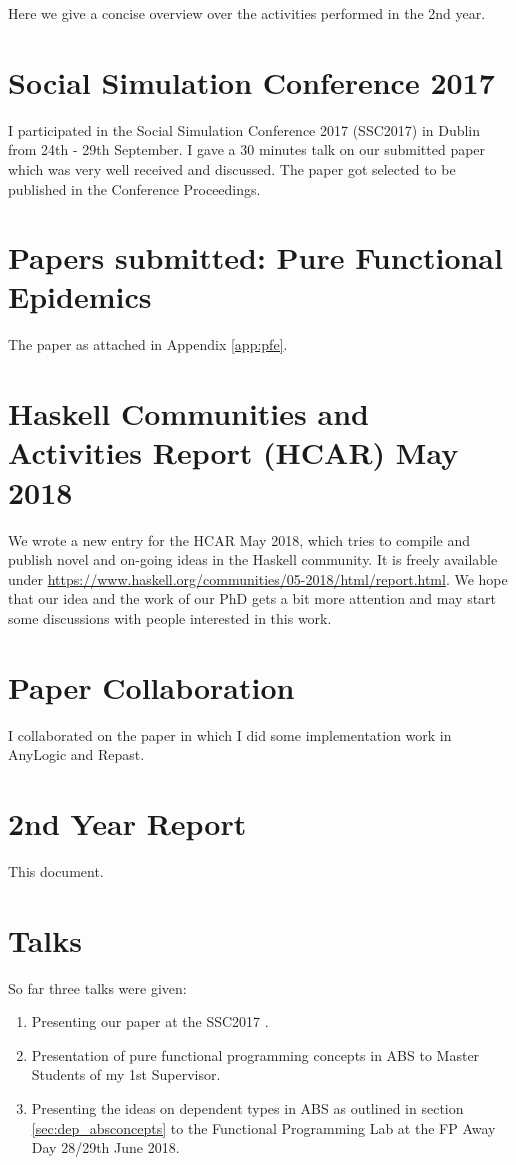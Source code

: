 Here we give a concise overview over the activities performed in the 2nd year.

\section{Social Simulation Conference 2017}
I participated in the Social Simulation Conference 2017 (SSC2017) in Dublin from 24th - 29th September. I gave a 30 minutes talk on our submitted paper \cite{thaler_art_2017} which was very well received and discussed. The paper got selected to be published in the Conference Proceedings.

\section{Papers submitted: Pure Functional Epidemics}
The paper as attached in Appendix \ref{app:pfe}.

\section{Haskell Communities and Activities Report (HCAR) May 2018}
We wrote a new entry for the HCAR May 2018, which tries to compile and publish novel and on-going ideas in the Haskell community. It is freely available under \url{https://www.haskell.org/communities/05-2018/html/report.html}. We hope that our idea and the work of our PhD gets a bit more attention and may start some discussions with people interested in this work.

\section{Paper Collaboration}
I collaborated on the paper \cite{siebers_proposal_2018} in which I did some implementation work in AnyLogic and Repast.

\section{2nd Year Report}
This document.

\section{Talks}
So far three talks were given:

\begin{enumerate}
	\item Presenting our paper \cite{thaler_art_2017} at the SSC2017 .
	\item Presentation of pure functional programming concepts in ABS to Master Students of my 1st Supervisor.
	\item Presenting the ideas on dependent types in ABS as outlined in section \ref{sec:dep_absconcepts} to the Functional Programming Lab at the FP Away Day 28/29th June 2018.
\end{enumerate} 

